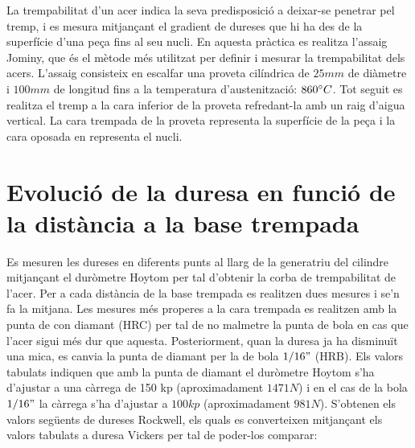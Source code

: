 \documentclass[a4paper]{report}
\begin{document}
La trempabilitat d’un acer indica la seva predisposició a deixar-se penetrar pel tremp, i es mesura mitjançant el gradient de dureses que hi ha des de la superfície d’una peça fins al seu nucli. En aquesta pràctica es realitza l’assaig Jominy, que és el mètode més utilitzat per definir i mesurar la trempabilitat dels acers. L’assaig consisteix en escalfar una proveta cilíndrica de $25 mm$ de diàmetre i $100 mm$ de longitud fins a la temperatura d’austenització: $860 \degree C$. Tot seguit es realitza el tremp a la cara inferior de la proveta refredant-la amb un raig d’aigua vertical. La cara trempada de la proveta representa la superfície de la peça i la cara oposada en representa el nucli. 

\section{Evolució de la duresa en funció de la distància a la base trempada}
Es mesuren les dureses en diferents punts al llarg de la generatriu del cilindre mitjançant el duròmetre Hoytom per tal d’obtenir la corba de trempabilitat de l’acer. Per a cada distància de la base trempada es realitzen dues mesures i se'n fa la mitjana. Les mesures més properes a la cara trempada es realitzen amb la punta de con diamant (HRC) per tal de no malmetre la punta de bola en cas que l’acer sigui més dur que aquesta. Posteriorment, quan la duresa ja ha disminuït una mica, es canvia la punta de diamant per la de bola $1/16"$ (HRB). Els valors tabulats indiquen que amb la punta de diamant el duròmetre Hoytom s’ha d’ajustar a una càrrega de 150 kp (aproximadament $1471 N$) i en el cas de la bola $1/16"$ la càrrega s’ha d’ajustar a $100 kp$ (aproximadament $981 N$). S’obtenen els valors següents de dureses Rockwell, els quals es converteixen mitjançant els valors tabulats a duresa Vickers per tal de poder-los comparar:
\end{document}
